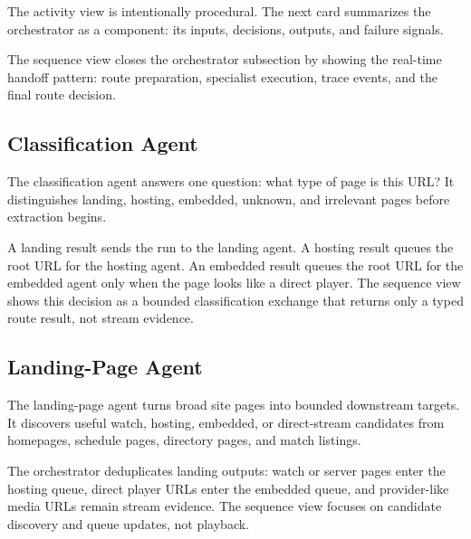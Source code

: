 

The activity view is intentionally procedural. The next card summarizes the
orchestrator as a component: its inputs, decisions, outputs, and failure signals.



The sequence view closes the orchestrator subsection by showing the real-time
handoff pattern: route preparation, specialist execution, trace events, and the
final route decision.


\FloatBarrier
\clearpage

\subsection{Classification Agent}

The classification agent answers one question: what type of page is this URL\@?
It distinguishes landing, hosting, embedded, unknown, and irrelevant pages before
extraction begins.



A landing result sends the run to the landing agent. A hosting result queues the
root URL for the hosting agent. An embedded result queues the root URL for the
embedded agent only when the page looks like a direct player. The sequence view
shows this decision as a bounded classification exchange that returns only a
typed route result, not stream evidence.


\FloatBarrier
\clearpage

\subsection{Landing-Page Agent}

The landing-page agent turns broad site pages into bounded downstream targets.
It discovers useful watch, hosting, embedded, or direct-stream candidates from
homepages, schedule pages, directory pages, and match listings.



The orchestrator deduplicates landing outputs: watch or server pages enter the
hosting queue, direct player URLs enter the embedded queue, and provider-like
media URLs remain stream evidence. The sequence view focuses on candidate
discovery and queue updates, not playback.

